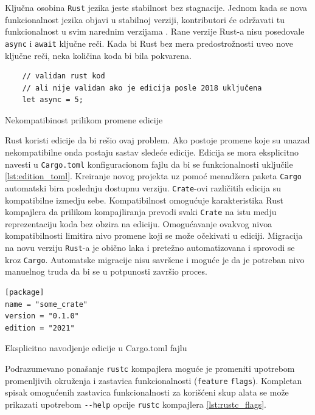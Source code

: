 \documentclass[11pt]{article}
\begin{document}
Ključna osobina \verb|Rust| jezika jeste stabilnost bez stagnacije. Jednom kada se nova 
funkcionalnost jezika objavi u stabilnoj verziji, kontributori će održavati 
tu funkcionalnost u svim narednim verzijama \cite{editions}.
Rane verzije Rust-a nisu posedovale \verb|async| i \verb|await| ključne reči.
Kada bi Rust bez mera predostrožnosti uveo nove ključne reči, neka količina koda bi bila pokvarena.

\begin{listing}[h]
\begin{verbatim}
    // validan rust kod 
    // ali nije validan ako je edicija posle 2018 uključena
    let async = 5; 
\end{verbatim}
\caption{Nekompatibinost prilikom promene edicije}
\label{lst:edition}
\end{listing}


Rust koristi edicije da bi rešio ovaj problem. Ako postoje promene koje su unazad 
nekompatibilne onda postaju sastav sledeće edicije. Edicija se mora eksplicitno navesti 
u \verb|Cargo.toml| konfiguracionom fajlu da bi se funkcionalnosti uključile \ref{lst:edition_toml}. Kreiranje novog projekta uz 
pomoć menadžera paketa \verb|Cargo| automatski bira poslednju dostupnu verziju.
\verb|Crate|-ovi različitih edicija su kompatibilne izmedju sebe. Kompatibilnost omogućuje 
karakteristika Rust kompajlera da prilikom kompajliranja prevodi svaki \verb|Crate| na istu medju reprezentaciju 
koda bez obzira na ediciju. Omogućavanje ovakvog nivoa kompatibilnosti limitira nivo promene 
koji se može očekivati u ediciji. Migracija na novu verziju \verb|Rust|-a je obično laka i pretežno automatizovana
i sprovodi se kroz \verb|Cargo|. Automatske migracije nisu savršene i moguće je da je potreban nivo manuelnog 
truda da bi se u potpunosti završio proces.

\begin{listing}[h]
\begin{verbatim}
[package]
name = "some_crate"
version = "0.1.0"
edition = "2021"

\end{verbatim}
\caption{Eksplicitno navodjenje edicije u Cargo.toml fajlu}
\label{lst:edition_toml}
\end{listing}

\newpage


Podrazumevano ponašanje \verb|rustc| kompajlera moguće je promeniti upotrebom promenljivih okruženja 
i zastavica funkcionalnosti (\verb|feature| \verb|flags|). Kompletan spisak omogućenih zastavica funkcionalnosti 
za korišćeni skup alata se može prikazati upotrebom \verb|--help| opcije \verb|rustc| kompajlera \ref{lst:rustc_flags}.
\end{document}
